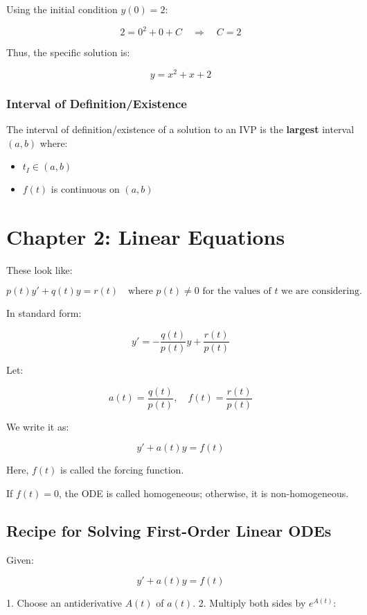 \documentclass{article}
\begin{document}
Using the initial condition \( y(0) = 2 \):

\[
2 = 0^2 + 0 + C \quad \Rightarrow \quad C = 2
\]

Thus, the specific solution is:

\[
y = x^2 + x + 2
\]

\subsubsection*{Interval of Definition/Existence}

The interval of definition/existence of a solution to an IVP is the \textbf{largest} interval \( (a, b) \) where:

\begin{itemize}
    \item \( t_I \in (a, b) \)
    \item \( f(t) \) is continuous on \( (a, b) \)
\end{itemize}

\section*{Chapter 2: Linear Equations}

These look like:

\[
p(t) y' + q(t) y = r(t) \quad \text{where } p(t) \neq 0 \text{ for the values of } t \text{ we are considering.}
\]

In standard form:

\[
y' = -\frac{q(t)}{p(t)} y + \frac{r(t)}{p(t)}
\]

Let:

\[
a(t) = \frac{q(t)}{p(t)}, \quad f(t) = \frac{r(t)}{p(t)}
\]

We write it as:

\[
y' + a(t) y = f(t)
\]

Here, \( f(t) \) is called the forcing function.

If \( f(t) = 0 \), the ODE is called homogeneous; otherwise, it is non-homogeneous.

\subsection*{Recipe for Solving First-Order Linear ODEs}

Given:

\[
y' + a(t) y = f(t)
\]

1. Choose an antiderivative \( A(t) \) of \( a(t) \).
2. Multiply both sides by \( e^{A(t)} \):
\end{document}
